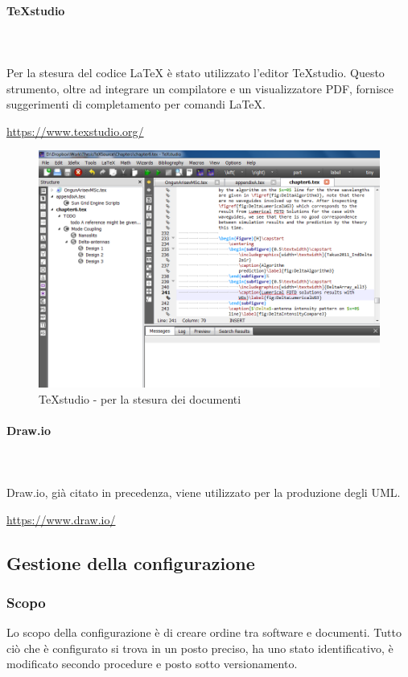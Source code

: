 			\paragraph{\TeX{}studio} \mbox{}\\ \mbox{}\\
			Per la stesura del codice \LaTeX{} è stato utilizzato l'editor \TeX{}studio. Questo strumento, oltre ad integrare un compilatore e un visualizzatore PDF, fornisce suggerimenti di completamento per comandi \LaTeX{}. \newline
			\centerline{\url{https://www.texstudio.org/}}
			\begin{figure}[H]
				\includegraphics[width=0.99\linewidth]{res/images/latex.jpg}
				\caption{\TeX{}studio - per la stesura dei documenti}
			\end{figure} 
			\paragraph{Draw.io} \mbox{}\\ \mbox{}\\
			Draw.io, già citato in precedenza, viene utilizzato per la produzione degli UML\glo. \newline
			\centerline{\url{https://www.draw.io/}}
			
	\subsection{Gestione della configurazione}
	\subsubsection{Scopo}
	Lo scopo della configurazione è di creare ordine tra software e documenti. Tutto ciò che è configurato si trova in un posto preciso, ha uno stato identificativo, è modificato secondo procedure e posto sotto versionamento.
